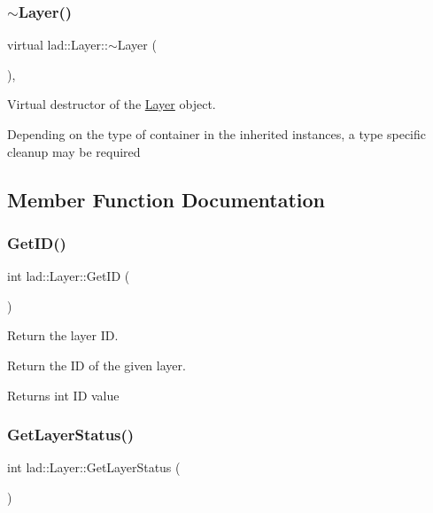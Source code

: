 \subsubsection{\texorpdfstring{$\sim$\+Layer()}{~Layer()}}
{\footnotesize\ttfamily virtual lad\+::\+Layer\+::$\sim$\+Layer (\begin{DoxyParamCaption}{ }\end{DoxyParamCaption})\hspace{0.3cm}{\ttfamily [inline]}, {\ttfamily [virtual]}}



Virtual destructor of the \hyperlink{classlad_1_1_layer}{Layer} object. 

Depending on the type of container in the inherited instances, a type specific cleanup may be required 

\subsection{Member Function Documentation}
\mbox{\label{classlad_1_1_layer_a10a5e4b4cf9618129d57c960805b7607}} 
\subsubsection{\texorpdfstring{Get\+I\+D()}{GetID()}}
{\footnotesize\ttfamily int lad\+::\+Layer\+::\+Get\+ID (\begin{DoxyParamCaption}{ }\end{DoxyParamCaption})}



Return the layer ID. 

Return the ID of the given layer.

\begin{DoxyReturn}{Returns}
int ID value 
\end{DoxyReturn}
\mbox{\label{classlad_1_1_layer_a8223ec6cf99de0275118e20faa011bc9}} 
\subsubsection{\texorpdfstring{Get\+Layer\+Status()}{GetLayerStatus()}}
{\footnotesize\ttfamily int lad\+::\+Layer\+::\+Get\+Layer\+Status (\begin{DoxyParamCaption}{ }\end{DoxyParamCaption})}



